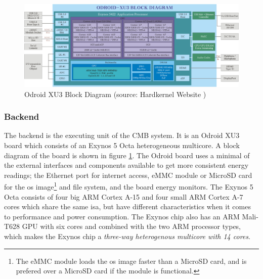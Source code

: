 \begin{figure}
    \includegraphics[width=1.0\textwidth]{figs/block-xu3.jpg}
    \caption[Odroid XU3 Block Diagram]{Odroid XU3 Block Diagram (source: Hardkernel Website \cite{XU3-BLOCK})}
    \label{fig:odroid-block}
\end{figure}

\subsubsection{Backend} The backend is the executing unit of the CMB system. It is an Odroid XU3 board \cite{XU3} which consists of an Exynos 5 Octa heterogeneous multicore. A block diagram of the board is shown in figure \ref{fig:odroid-block}.  The Odroid board uses a minimal of the external interfaces and components available to get more consistent energy readings; the Ethernet port for internet access, eMMC module or MicroSD card for the \gls{os} image\footnote{The eMMC module loads the \gls{os} image faster than a MicroSD card, and is prefered over a MicroSD card if the module is functional.} and file system, and the board energy monitors. The Exynos 5 Octa consists of four big ARM Cortex A-15 and four small ARM Cortex A-7 cores which share the same \gls{isa}, but have different characteristics when it comes to performance and power consumption. The Exynos chip also has an ARM Mali-T628 GPU with six cores and combined with the two ARM processor types, which makes the Exynos chip a \textit{three-way heterogenous multicore with 14 cores}. \\

